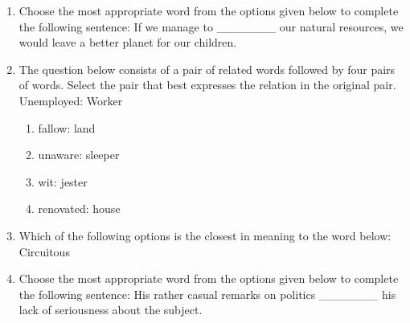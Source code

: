 \documentclass[12pt]{article}
\theoremstyle{remark}
\begin{document}
\begin{enumerate}
\item Choose the most appropriate word from the options given below to complete the following sentence:
If we manage to \_\_\_\_\_\_\_ our natural resources, we would leave a better planet for our children.
\begin{enumerate}
\end{enumerate}
\hfill{}

\item The question below consists of a pair of related words followed by four pairs of words. Select the pair that best expresses the relation in the original pair.
Unemployed: Worker
\begin{enumerate}
    \item fallow: land
    \item unaware: sleeper
    \item wit: jester
    \item renovated: house
\end{enumerate}
\hfill{}

\item Which of the following options is the closest in meaning to the word below:
Circuitous
\begin{enumerate}
\end{enumerate}
\hfill{}

\item Choose the most appropriate word from the options given below to complete the following sentence:
His rather casual remarks on politics \_\_\_\_\_\_\_ his lack of seriousness about the subject.
\begin{enumerate}
\end{enumerate}
\hfill{}


\end{enumerate}
\end{document}
